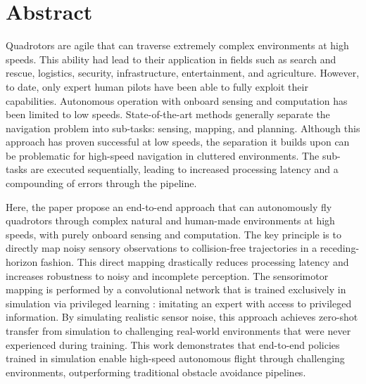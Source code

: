 \chapter*{Abstract}
Quadrotors are agile that can traverse extremely complex environments at high speeds. This ability had lead to their application in fields such as search and rescue, logistics, security, infrastructure, entertainment, and agriculture. However, to date, only expert human pilots have been able to fully exploit their capabilities. Autonomous operation with onboard sensing and computation has been limited to low speeds. State-of-the-art methods generally separate the navigation problem into sub-tasks: sensing, mapping, and planning. Although this approach has proven successful at low speeds, the separation it builds upon can be problematic for high-speed navigation in cluttered environments. The sub-tasks are executed sequentially, leading to increased processing latency and a compounding of errors through the pipeline.

Here, the paper \cite{high-speed-flight} propose an end-to-end approach that can autonomously fly quadrotors through complex natural and human-made environments at high speeds, with purely onboard sensing and computation. The key principle is to directly map noisy sensory observations to collision-free trajectories in a receding-horizon \cite{receding_horizon} fashion. This direct mapping drastically reduces processing latency and increases robustness to noisy and incomplete perception. The sensorimotor mapping is performed by a convolutional network that is trained exclusively in simulation via privileged learning : imitating an expert with access to privileged information. By simulating realistic sensor noise, this approach achieves zero-shot transfer from simulation to challenging real-world environments that were never experienced during training. This work demonstrates that end-to-end policies trained in simulation enable high-speed autonomous flight through challenging environments, outperforming traditional obstacle avoidance pipelines.